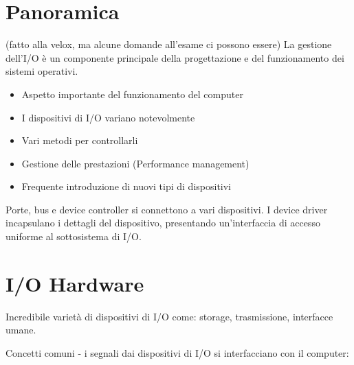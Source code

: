 \section{Panoramica}
(fatto alla velox, ma alcune domande all'esame ci possono essere)
La gestione dell'I/O è un componente principale della progettazione e del funzionamento dei sistemi operativi.

\begin{itemize}
  \item Aspetto importante del funzionamento del computer
  \item I dispositivi di I/O variano notevolmente
  \item Vari metodi per controllarli
  \item Gestione delle prestazioni (Performance management)
  \item Frequente introduzione di nuovi tipi di dispositivi
\end{itemize}

Porte, bus e device controller si connettono a vari dispositivi.
I device driver incapsulano i dettagli del dispositivo, presentando un'interfaccia di accesso uniforme al sottosistema di I/O.

\section{I/O Hardware}

Incredibile varietà di dispositivi di I/O come: storage, trasmissione, interfacce umane.

Concetti comuni - i segnali dai dispositivi di I/O si interfacciano con il computer:

